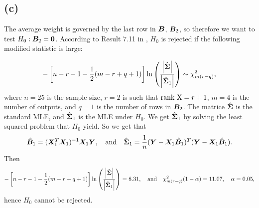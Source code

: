 \subsection*{(c)}
\label{sec:c-5}

The average weight is governed by the last row in $\bm{B}$, $\bm{B}_{2}$, so therefore we
want to test $H_{0}: \bm{B}_{2} = \bm{0}$. According to Result 7.11 in
\cite[p. 396]{book}, $H_{0}$ is rejected if the  following modified statistic is large:

\begin{equation*}
  -\left[n - r- 1 - \frac{1}{2}(m-r+q+1)\right]\ln
  \left(
    \frac{\left| \hat{\bm{\Sigma}} \right|}{\left| \hat{\bm{\Sigma}}_{1} \right|}
  \right) \sim \chi^{2}_{m(r-q)},
\end{equation*}
where $n= 25$ is the sample size, $r=2$ is such that $\text{rank X} = r + 1$,
$m=4$ is the number of outputs, and $q=1$ is the number of rows in
$\bm{B}_{2}$. The matrice $\hat{\bm{\Sigma}}$ is the standard MLE, and
$\hat{\bm{\Sigma}}_{1}$ is the MLE under $H_{0}$. We get $\hat{\bm{\Sigma}}_{1}$
by solving the least squared problem that $H_{0}$ yield. So we get that
\begin{equation*}
  \hat{\bm{B}}_{1} = (\bm{X}_{1}^{T} \bm{X}_{1})^{-1}\bm{X}_{1} \bm{Y}, \quad
  \text{and} \quad 
  \hat{\bm{\Sigma}}_{1} = \frac{1}{n} (\bm{Y}  - \bm{X}_{1} \hat{\bm{B}}_{1})^{T}(\bm{Y}  - \bm{X}_{1} \hat{\bm{B}}_{1}).
\end{equation*}
Then
\begin{equation*}
    -\left[n - r- 1 - \frac{1}{2}(m-r+q+1)\right]\ln
  \left(
    \frac{\left| \hat{\bm{\Sigma}} \right|}{\left| \hat{\bm{\Sigma}}_{1} \right|}
  \right) =8.31, \quad \text{and}\quad \chi^{2}_{m(r-q)}(1 - \alpha) = 11.07,\quad \alpha = 0.05,
\end{equation*}
hence $H_{0}$ cannot be rejected. 


